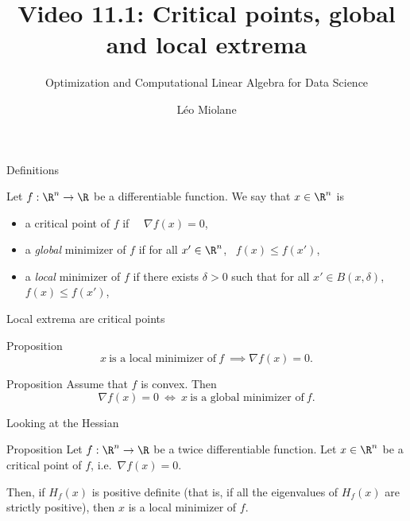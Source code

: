 \documentclass{beamer}
\title{Video 11.1: Critical points, global and local extrema}
\subtitle{Optimization and Computational Linear Algebra for Data Science}
\author{Léo Miolane}
\date{}
\begin{document}
\setcounter{showProgressBar}{0}
\setcounter{showSlideNumbers}{0}

\frame{\titlepage}
\setcounter{framenumber}{0}
\setcounter{showSlideNumbers}{1}




\begin{frame}[t]{Definitions}
	\grid

	\vspace{-0.2cm}
	\begin{definition}
		Let $f: \R^n \to \R$ be a differentiable function.
		We say that $x \in \R^n$ is
		\begin{itemize}
			\item a critical point of $f$ if \ \ $\nabla f(x) = 0$,
			\item a \emph{global} minimizer of $f$ if for all $x' \in \R^n$, \ $f(x) \leq f(x')$,
			\item a \emph{local} minimizer of $f$ if there exists $\delta > 0$ such that for all $x' \in B(x,\delta)$, $f(x) \leq f(x')$,
		\end{itemize}

	\end{definition}

\end{frame}

\begin{frame}[t]{Local extrema are critical points}
	\grid

	\vspace{-0.2cm}
	\begin{block}{Proposition}
	\vspace{-0.2cm}
		$$
		x \ \text{is a local minimizer of} \ f \ \implies \nabla f(x) = 0.
		$$
	\end{block}

	\begin{block}{Proposition}
		Assume that $f$ is convex. Then
		$$
		\nabla f(x) = 0 \ \Longleftrightarrow \ x \ \text{is a global minimizer of} \ f.
		$$
	\end{block}

\end{frame}

\begin{frame}[t]{Looking at the Hessian}
	\grid

	\vspace{-0.2cm}
	\begin{block}{Proposition}
	Let $f:\R^n \to \R$ be a twice differentiable function. Let $x \in \R^n$ be a critical point of $f$, i.e.\ $\nabla f(x) = 0$. 

	Then, if $H_f(x)$ is positive definite (that is, if all the eigenvalues of $H_f(x)$ are strictly positive), then $x$ is a local minimizer of $f$.
	\end{block}

\end{frame}
\end{document}
